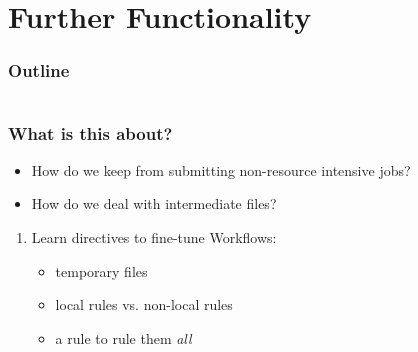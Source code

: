 \section{Further Functionality}

\begin{frame}
    \frametitle{Outline}
    \begin{columns}[t]
        \begin{column}{.5\textwidth}
            \tableofcontents[sections={1-9},currentsection]
        \end{column}
        \begin{column}{.5\textwidth}
            \tableofcontents[sections={10-18},currentsection]
        \end{column}
    \end{columns}
\end{frame}

\begin{frame}
  \frametitle{What is this about?}
   \begin{question}[Questions]
     \begin{itemize}
          \item How do we keep \Snakemake{} from submitting non-resource intensive jobs?
          \item How do we deal with intermediate files?
     \end{itemize}
   \end{question}
   \begin{docs}[Objectives]
   	 \begin{enumerate} 
        \item Learn directives to fine-tune Workflows:
        \begin{itemize}
           \item temporary files
           \item local rules vs. non-local rules
           \item a rule to rule them \emph{all}
         \end{itemize}
     \end{enumerate}
 \end{docs}
\end{frame}


